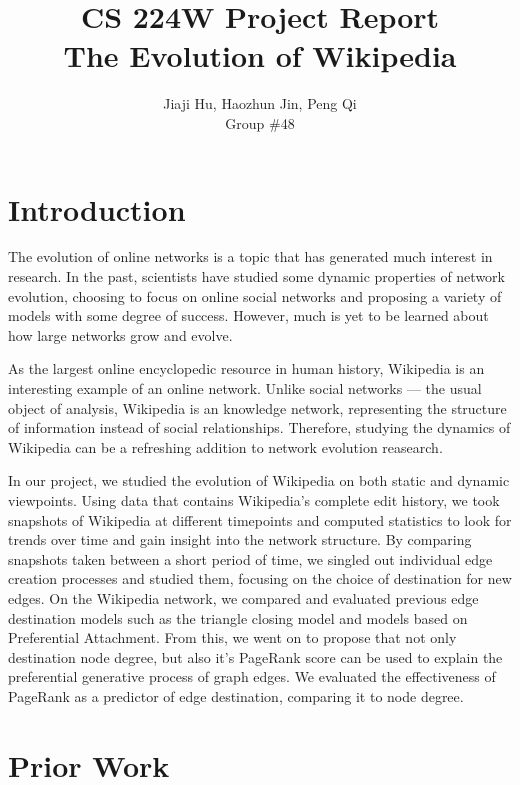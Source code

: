 \documentclass[10pt,twocolumn]{article}
\begin{document}
\title{CS 224W Project Report\\ The Evolution of Wikipedia}
\author{Jiaji Hu, Haozhun Jin, Peng Qi\\Group \#48}
\date{}
\maketitle

\section{Introduction}

The evolution of online networks is a topic that has generated much interest in research. In the past, scientists have studied some dynamic properties of network evolution, choosing to focus on online social networks and proposing a variety of models with some degree of success. However, much is yet to be learned about how large networks grow and evolve.

As the largest online encyclopedic resource in human history, Wikipedia is an interesting example of an online network. Unlike social networks --- the usual object of analysis, Wikipedia is an knowledge network, representing the structure of information instead of social relationships. Therefore, studying the dynamics of Wikipedia can be a refreshing addition to network evolution reasearch.

In our project, we studied the evolution of Wikipedia on both static and dynamic viewpoints. Using data that contains Wikipedia's complete edit history, we took snapshots of Wikipedia at different timepoints and computed statistics to look for trends over time and gain insight into the network structure. By comparing snapshots taken between a short period of time, we singled out individual edge creation processes and studied them, focusing on the choice of destination for new edges. On the Wikipedia network, we compared and evaluated previous edge destination models such as the triangle closing model and models based on Preferential Attachment. From this, we went on to propose that not only destination node degree, but also it's PageRank score can be used to explain the preferential generative process of graph edges. We evaluated the effectiveness of PageRank as a predictor of edge destination, comparing it to node degree.
\section{Prior Work}
\end{document}
